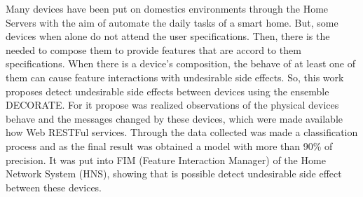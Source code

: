 Many devices have been put on domestics environments through the Home Servers with the aim of automate the daily tasks of a smart home. But, some devices when alone do not attend the user specifications. Then, there is the needed to compose them to provide features that are accord to them specifications. When there is a device's composition, the behave of at least one of them can cause feature interactions with undesirable side effects. So, this work proposes detect undesirable side effects between devices using the ensemble DECORATE. For it propose was realized observations of the physical devices behave and the messages changed by these devices, which were made available how Web RESTFul services. Through the data collected was made a classification process and as the final result was obtained a model with more than 90\% of precision. It was put into FIM (Feature Interaction Manager) of the Home Network System (HNS), showing that is possible detect undesirable side effect between these devices.
